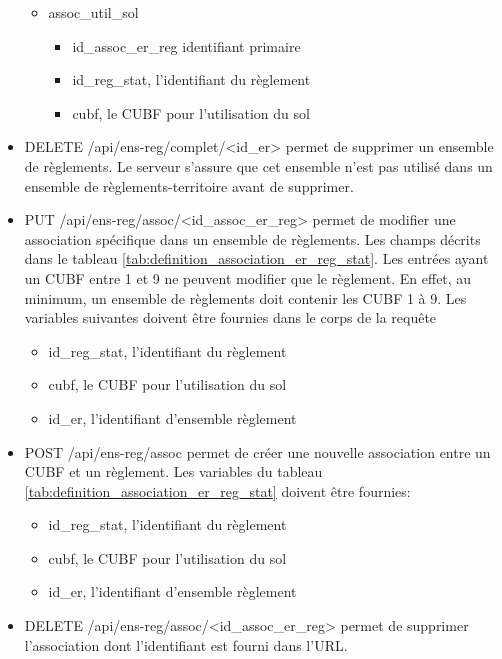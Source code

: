 \begin{itemize}
\begin{itemize}
            \item assoc\_util\_sol
                \begin{itemize} 
                    \item id\_assoc\_er\_reg identifiant primaire
                    \item id\_reg\_stat, l'identifiant du règlement
                    \item cubf, le \ac{CUBF} pour l'utilisation du sol
                \end{itemize}
        \end{itemize}
    \item DELETE /api/ens-reg/complet/<id\_er> permet de supprimer un ensemble de règlements. Le serveur s'assure que cet ensemble n'est pas utilisé dans un ensemble de règlements-territoire avant de supprimer.
    \item PUT /api/ens-reg/assoc/<id\_assoc\_er\_reg> permet de modifier une association spécifique dans un ensemble de règlements. Les champs décrits dans le tableau \ref{tab:definition_association_er_reg_stat}. Les entrées ayant un \ac{CUBF} entre 1 et 9 ne peuvent modifier que le règlement. En effet, au minimum, un ensemble de règlements doit contenir les CUBF 1 à 9. Les variables suivantes doivent être fournies dans le corps de la requête
    \begin{itemize}
        \item id\_reg\_stat, l'identifiant du règlement
        \item cubf, le \ac{CUBF} pour l'utilisation du sol
        \item id\_er, l'identifiant d'ensemble règlement
    \end{itemize}
    \item POST /api/ens-reg/assoc permet de créer une nouvelle association entre un \ac{CUBF} et un règlement. Les variables du tableau \ref{tab:definition_association_er_reg_stat} doivent être fournies:
    \begin{itemize}
        \item id\_reg\_stat, l'identifiant du règlement
        \item cubf, le \ac{CUBF} pour l'utilisation du sol
        \item id\_er, l'identifiant d'ensemble règlement
    \end{itemize}
    \item DELETE /api/ens-reg/assoc/<id\_assoc\_er\_reg> permet de supprimer l'association dont l'identifiant est fourni dans l'\ac{URL}.
\end{itemize}\clearpage
